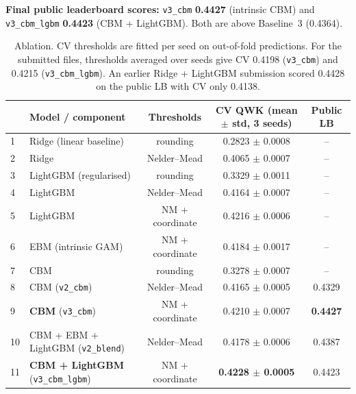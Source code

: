 \documentclass[10pt,a4paper]{article}
\begin{document}
\textbf{Final public leaderboard scores:} \texttt{v3\_cbm} \textbf{0.4427} (intrinsic CBM) and \texttt{v3\_cbm\_lgbm} \textbf{0.4423} (CBM + LightGBM). Both are above Baseline~3 (0.4364).

\begin{table}[h]\centering\small
\begin{tabular}{@{}llccc@{}}\toprule
 & Model / component & Thresholds & CV QWK (mean $\pm$ std, 3 seeds) & Public LB \\\midrule
1 & Ridge (linear baseline) & rounding & 0.2823 $\pm$ 0.0008 & -- \\
2 & Ridge & Nelder--Mead & 0.4065 $\pm$ 0.0007 & -- \\
3 & LightGBM (regularised) & rounding & 0.3329 $\pm$ 0.0011 & -- \\
4 & LightGBM & Nelder--Mead & 0.4164 $\pm$ 0.0007 & -- \\
5 & LightGBM & NM + coordinate & 0.4216 $\pm$ 0.0006 & -- \\
6 & EBM \cite{ebm} (intrinsic GAM) & NM + coordinate & 0.4184 $\pm$ 0.0017 & -- \\\midrule
7 & CBM & rounding & 0.3278 $\pm$ 0.0007 & -- \\
8 & CBM (\texttt{v2\_cbm}) & Nelder--Mead & 0.4165 $\pm$ 0.0005 & 0.4329 \\
9 & \textbf{CBM} (\texttt{v3\_cbm}) & NM + coordinate & 0.4210 $\pm$ 0.0007 & \textbf{0.4427} \\
10 & CBM + EBM + LightGBM (\texttt{v2\_blend}) & Nelder--Mead & 0.4178 $\pm$ 0.0006 & 0.4387 \\
11 & \textbf{CBM + LightGBM} (\texttt{v3\_cbm\_lgbm}) & NM + coordinate & \textbf{0.4228 $\pm$ 0.0005} & 0.4423 \\\bottomrule
\end{tabular}
\caption{Ablation. CV thresholds are fitted per seed on out-of-fold predictions. For the submitted files, thresholds averaged over seeds give CV 0.4198 (\texttt{v3\_cbm}) and 0.4215 (\texttt{v3\_cbm\_lgbm}). An earlier Ridge + LightGBM submission scored 0.4428 on the public LB with CV only 0.4138.}\label{tab:abl}
\end{table}
\end{document}
